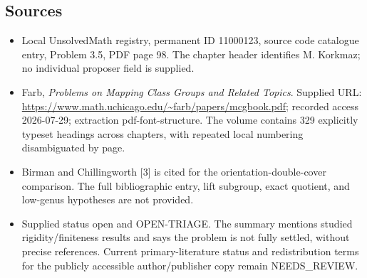 \documentclass[11pt]{article}
\begin{document}
\subsection{Sources}
\begin{itemize}
\item Local UnsolvedMath registry, permanent ID 11000123, source code catalogue entry, Problem 3.5, PDF page 98. The chapter header identifies M. Korkmaz; no individual proposer field is supplied.
\item Farb, \emph{Problems on Mapping Class Groups and Related Topics}. Supplied URL: \url{https://www.math.uchicago.edu/~farb/papers/mcgbook.pdf}; recorded access 2026-07-29; extraction pdf-font-structure. The volume contains 329 explicitly typeset headings across chapters, with repeated local numbering disambiguated by page.
\item Birman and Chillingworth [3] is cited for the orientation-double-cover comparison. The full bibliographic entry, lift subgroup, exact quotient, and low-genus hypotheses are not provided.
\item Supplied status open and OPEN-TRIAGE. The summary mentions studied rigidity/finiteness results and says the problem is not fully settled, without precise references. Current primary-literature status and redistribution terms for the publicly accessible author/publisher copy remain NEEDS\_REVIEW.
\end{itemize}
\end{document}
